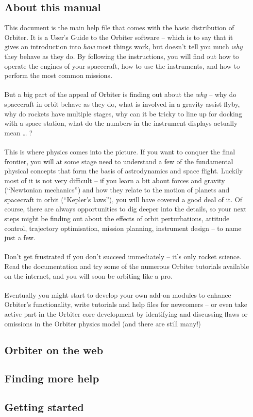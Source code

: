 \documentclass[Orbiter User Manual.tex]{subfiles}
\begin{document}
\subsection{About this manual}
This document is the main help file that comes with the basic distribution of Orbiter. It is a User’s Guide to the Orbiter software – which is to say that it gives an introduction into \textit{how} most things work, but doesn’t tell you much \textit{why} they behave as they do. By following the instructions, you will find out how to operate the engines of your spacecraft, how to use the instruments, and how to perform the most common missions.\\
\\
But a big part of the appeal of Orbiter is finding out about the \textit{why} – why do spacecraft in orbit behave as they do, what is involved in a gravity-assist flyby, why do rockets have multiple stages, why can it be tricky to line up for docking with a space station, what do the numbers in the instrument displays actually mean … ?\\
\\
This is where physics comes into the picture. If you want to conquer the final frontier, you will at some stage need to understand a few of the fundamental physical concepts that form the basis of astrodynamics and space flight. Luckily most of it is not very difficult – if you learn a bit about forces and gravity (“Newtonian mechanics”) and how they relate to the motion of planets and spacecraft in orbit (“Kepler’s laws”), you will have covered a good deal of it. Of course, there are always opportunities to dig deeper into the details, so your next steps might be finding out about the effects of orbit perturbations, attitude control, trajectory optimisation, mission planning, instrument design – to name just a few.\\
\\
Don’t get frustrated if you don’t succeed immediately – it’s only rocket science. Read the documentation and try some of the numerous Orbiter tutorials available on the internet, and you will soon be orbiting like a pro.\\
\\
Eventually you might start to develop your own add-on modules to enhance Orbiter’s functionality, write tutorials and help files for newcomers – or even take active part in the Orbiter core development by identifying and discussing flaws or omissions in the Orbiter physics model (and there are still many!)

\subsection{Orbiter on the web}

\subsection{Finding more help}

\subsection{Getting started}
\end{document}
